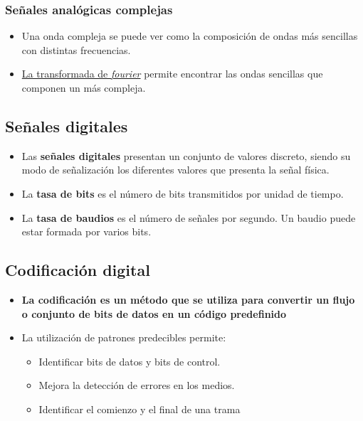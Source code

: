 \documentclass[11pt]{article}
\begin{document}
\subsubsection{Señales analógicas complejas}
\label{sec:org9b84b05}
\begin{itemize}
\item Una onda compleja se puede ver como la composición de ondas más sencillas con distintas frecuencias.
\item \href{https://es.wikipedia.org/wiki/Transformada\_de\_Fourier}{La transformada de \emph{fourier}} permite encontrar las ondas sencillas que componen un más compleja.
\end{itemize}
\subsection{Señales digitales}
\label{sec:orgb5ac414}
\begin{itemize}
\item Las \textbf{señales digitales} presentan un conjunto de valores discreto, siendo su modo de señalización los diferentes valores que presenta la señal física.
\item La \textbf{tasa de bits} es el número de bits transmitidos por unidad de tiempo.
\item La \textbf{tasa de baudios} es el número de señales por segundo. Un baudio puede estar formada por varios bits.
\end{itemize}
\subsection{Codificación \textbf{digital}}
\label{sec:org2ae968e}
\begin{itemize}
\item \textbf{La codificación es un método que se utiliza para convertir un flujo o conjunto de bits de datos en un código predefinido}
\item La utilización de patrones predecibles permite:
\begin{itemize}
\item Identificar bits de datos y bits de control.
\item Mejora la detección de errores en los medios.
\item Identificar el comienzo y el final de una trama
\end{itemize}
\end{itemize}
\end{document}
